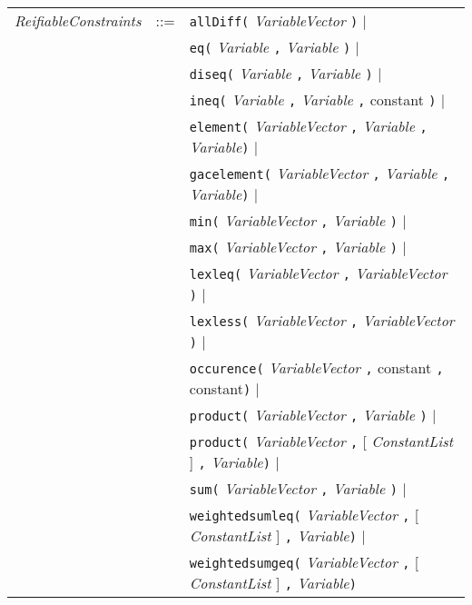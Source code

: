\documentclass{article}
\begin{document}
\begin{small}
\begin{tabular}{rcl}
\textit{ReifiableConstraints} & ::= &  \texttt{allDiff(} \textit{VariableVector} \texttt{)} $\mid$ \\
                &     & \texttt{eq(} \textit{Variable} \texttt{,} \textit{Variable} \texttt{)} $\mid$ \\
                &     & \texttt{diseq(} \textit{Variable} \texttt{,} \textit{Variable} \texttt{)} $\mid$ \\
                &     & \texttt{ineq(} \textit{Variable} \texttt{,} \textit{Variable} \texttt{,} constant \texttt{)} $\mid$ \\
                &     & \texttt{element(} \textit{VariableVector} \texttt{,} \textit{Variable} \texttt{,} \textit{Variable}\texttt{)} $\mid$ \\
                &     & \texttt{gacelement(} \textit{VariableVector} \texttt{,} \textit{Variable} \texttt{,} \textit{Variable}\texttt{)} $\mid$ \\
                &     & \texttt{min(} \textit{VariableVector} \texttt{,} \textit{Variable} \texttt{)} $\mid$ \\
                &     & \texttt{max(} \textit{VariableVector} \texttt{,} \textit{Variable} \texttt{)} $\mid$ \\
                &     & \texttt{lexleq(} \textit{VariableVector} \texttt{,} \textit{VariableVector} \texttt{)} $\mid$ \\
                &     & \texttt{lexless(} \textit{VariableVector} \texttt{,} \textit{VariableVector} \texttt{)} $\mid$ \\
                &     & \texttt{occurence(} \textit{VariableVector} \texttt{,} constant \texttt{,} constant\texttt{)} $\mid$ \\
                &     & \texttt{product(} \textit{VariableVector} \texttt{,} \textit{Variable} \texttt{)} $\mid$ \\
                &     & \texttt{product(} \textit{VariableVector} \texttt{,} [ \textit{ConstantList} ] \texttt{,} \textit{Variable}\texttt{)} $\mid$ \\
                &     & \texttt{sum(} \textit{VariableVector} \texttt{,} \textit{Variable} \texttt{)}  $\mid$\\
                &     & \texttt{weightedsumleq(} \textit{VariableVector} \texttt{,} [ \textit{ConstantList} ] \texttt{,} \textit{Variable}\texttt{)} $\mid$ \\
                &     & \texttt{weightedsumgeq(} \textit{VariableVector} \texttt{,} [ \textit{ConstantList} ] \texttt{,} \textit{Variable}\texttt{)} \\




\end{tabular}
\end{small}
\end{document}
